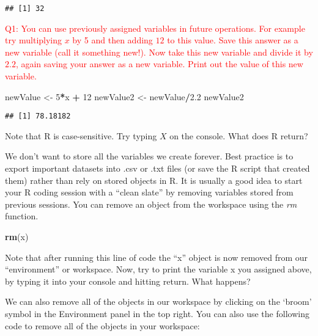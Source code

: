 \documentclass[]{article}
\newenvironment{Shaded}{\begin{snugshade}}{\end{snugshade}}
\newcommand{\DecValTok}[1]{\textcolor[rgb]{0.00,0.00,0.81}{#1}}
\newcommand{\FloatTok}[1]{\textcolor[rgb]{0.00,0.00,0.81}{#1}}
\newcommand{\KeywordTok}[1]{\textcolor[rgb]{0.13,0.29,0.53}{\textbf{#1}}}
\newcommand{\NormalTok}[1]{#1}
\newcommand{\OperatorTok}[1]{\textcolor[rgb]{0.81,0.36,0.00}{\textbf{#1}}}
\newcommand{\StringTok}[1]{\textcolor[rgb]{0.31,0.60,0.02}{#1}}
\begin{document}
\begin{verbatim}
## [1] 32
\end{verbatim}

\textcolor{red}{Q1: You can  use previously assigned variables in future operations. For example try multiplying $x$ by 5 and then adding $12$ to this value. Save this answer as a new variable (call it something new!). Now take this new variable and divide it by $2.2$, again saving your answer as a new variable. Print out the value of this new variable.}

\begin{Shaded}
\begin{Highlighting}[]
\NormalTok{newValue <-}\StringTok{ }\DecValTok{5}\OperatorTok{*}\NormalTok{x }\OperatorTok{+}\StringTok{ }\DecValTok{12} 
\NormalTok{newValue2 <-}\StringTok{ }\NormalTok{newValue}\OperatorTok{/}\FloatTok{2.2}
\NormalTok{newValue2}
\end{Highlighting}
\end{Shaded}

\begin{verbatim}
## [1] 78.18182
\end{verbatim}

Note that R is case-sensitive. Try typing \(X\) on the console. What
does R return?

We don't want to store all the variables we create forever. Best
practice is to export important datasets into .csv or .txt files (or
save the R script that created them) rather than rely on stored objects
in R. It is usually a good idea to start your R coding session with a
``clean slate'' by removing variables stored from previous sessions. You
can remove an object from the workspace using the \emph{rm} function.

\begin{Shaded}
\begin{Highlighting}[]
\KeywordTok{rm}\NormalTok{(x)}
\end{Highlighting}
\end{Shaded}

Note that after running this line of code the ``x'' object is now
removed from our ``environment'' or workspace. Now, try to print the
variable x you assigned above, by typing it into your console and
hitting return. What happens?

We can also remove all of the objects in our workspace by clicking on
the `broom' symbol in the Environment panel in the top right. You can
also use the following code to remove all of the objects in your
workspace:
\end{document}
